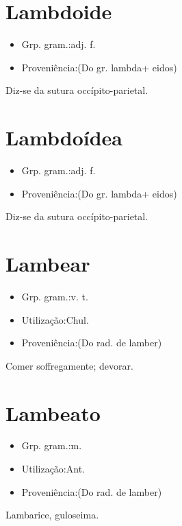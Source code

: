 \section{Lambdoide}
\begin{itemize}
\item {Grp. gram.:adj. f.}
\end{itemize}
\begin{itemize}
\item {Proveniência:(Do gr. \textunderscore lambda\textunderscore  + \textunderscore eidos\textunderscore )}
\end{itemize}
Diz-se da sutura occípito-parietal.
\section{Lambdoídea}
\begin{itemize}
\item {Grp. gram.:adj. f.}
\end{itemize}
\begin{itemize}
\item {Proveniência:(Do gr. \textunderscore lambda\textunderscore  + \textunderscore eidos\textunderscore )}
\end{itemize}
Diz-se da sutura occípito-parietal.
\section{Lambear}
\begin{itemize}
\item {Grp. gram.:v. t.}
\end{itemize}
\begin{itemize}
\item {Utilização:Chul.}
\end{itemize}
\begin{itemize}
\item {Proveniência:(Do rad. de \textunderscore lamber\textunderscore )}
\end{itemize}
Comer soffregamente; devorar.
\section{Lambeato}
\begin{itemize}
\item {Grp. gram.:m.}
\end{itemize}
\begin{itemize}
\item {Utilização:Ant.}
\end{itemize}
\begin{itemize}
\item {Proveniência:(Do rad. de \textunderscore lamber\textunderscore )}
\end{itemize}
Lambarice, guloseima.
